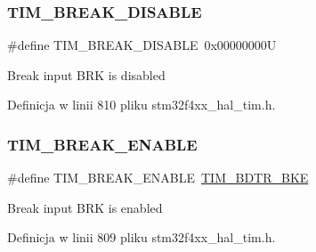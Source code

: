 \subsubsection{\texorpdfstring{T\+I\+M\+\_\+\+B\+R\+E\+A\+K\+\_\+\+D\+I\+S\+A\+B\+LE}{TIM\_BREAK\_DISABLE}}
{\footnotesize\ttfamily \#define T\+I\+M\+\_\+\+B\+R\+E\+A\+K\+\_\+\+D\+I\+S\+A\+B\+LE~0x00000000U}

Break input B\+RK is disabled 

Definicja w linii 810 pliku stm32f4xx\+\_\+hal\+\_\+tim.\+h.

\mbox{\label{group___t_i_m___break___input__enable__disable_ga3f966247b03532b8d93f9bddc032d863}} 
\subsubsection{\texorpdfstring{T\+I\+M\+\_\+\+B\+R\+E\+A\+K\+\_\+\+E\+N\+A\+B\+LE}{TIM\_BREAK\_ENABLE}}
{\footnotesize\ttfamily \#define T\+I\+M\+\_\+\+B\+R\+E\+A\+K\+\_\+\+E\+N\+A\+B\+LE~\hyperlink{group___peripheral___registers___bits___definition_ga74250b040dd9fd9c09dcc54cdd6d86d8}{T\+I\+M\+\_\+\+B\+D\+T\+R\+\_\+\+B\+KE}}

Break input B\+RK is enabled 

Definicja w linii 809 pliku stm32f4xx\+\_\+hal\+\_\+tim.\+h.

